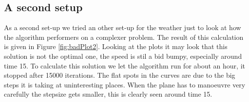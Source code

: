 \subsection{A second setup}


As a second set-up we tried an other set-up for the weather just to look at how the algorithm performers on a complexer problem.
The result of this calculation is given in  Figure \ref{fig:badPlot2}.
Looking at the plots it may look that this solution is not the optimal one, the speed is stil a bid bumpy, especially around time 15.
To calculate this solution we let the algorithm run for about an hour, it stopped after 15000 iterations.
The flat spots in the curves are due to the big steps it is taking at uninteresting places.
When the plane has to manoeuvre very carefully the stepsize gets smaller, this is clearly seen around time 15.



